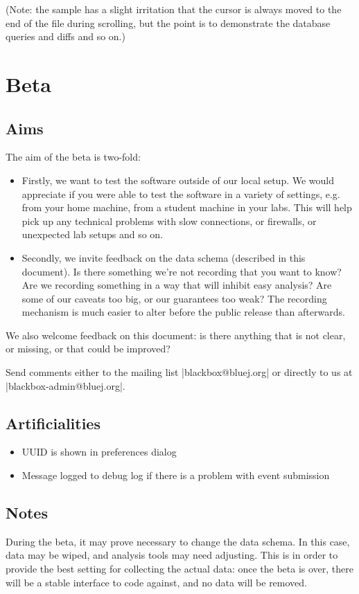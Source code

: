 \documentclass{report}
\begin{document}
(Note: the sample has a slight irritation that the cursor is always moved to the end
of the file during scrolling, but the point is to demonstrate the database
queries and diffs and so on.)

\chapter{Beta}
\label{sec:beta}

\section{Aims}

The aim of the beta is two-fold:

\begin{itemize}
\item Firstly, we want to test the software outside of our local setup.  We
  would appreciate if you were able to test the software in a variety of
  settings, e.g. from your home machine, from a student machine in your labs.
  This will help pick up any technical problems with slow connections, or
  firewalls, or unexpected lab setups and so on.
\item Secondly, we invite feedback on the data schema (described in
  this document).  Is there something we're not recording that you want to
  know?  Are we recording something in a way that will inhibit easy
  analysis?  Are some of our caveats too big, or our guarantees too
  weak?  The recording mechanism is much easier to alter before the
  public release than afterwards.
\end{itemize}

We also welcome feedback on this document: is there anything that is
not clear, or missing, or that could be improved?

Send comments either to the mailing list |blackbox@bluej.org| or
directly to us at |blackbox-admin@bluej.org|.

\section{Artificialities}

\begin{itemize}
\item UUID is shown in preferences dialog
\item Message logged to debug log if there is a problem with event submission
\end{itemize}

\section{Notes}

During the beta, it may prove necessary to change the data schema.  In this
case, data may be wiped, and analysis tools may need adjusting.  This is in
order to provide the best setting for collecting the actual data: once the
beta is over, there will be a stable interface to code against, and no data
will be removed.
\end{document}
